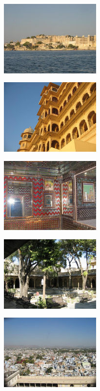 \begin{multicols}{2}
\smallbreak
\hspace*{-0.65cm}
\includegraphics[width=5cm]{articles/Il-commence-a-faire-chaud/palacelac.jpg}
\smallbreak

\smallbreak
\hspace*{-0.65cm}
\includegraphics[width=5cm]{articles/Il-commence-a-faire-chaud/citylac2.jpg}
\smallbreak

\smallbreak
\hspace*{-0.65cm}
\includegraphics[width=5cm]{articles/Il-commence-a-faire-chaud/citysalle.jpg}
\smallbreak

\smallbreak
\hspace*{-0.65cm}
\includegraphics[width=5cm]{articles/Il-commence-a-faire-chaud/citycours.jpg}
\smallbreak

\smallbreak
\hspace*{-0.65cm}
\includegraphics[width=5cm]{articles/Il-commence-a-faire-chaud/udaipur.jpg}
\smallbreak


\end{multicols}
